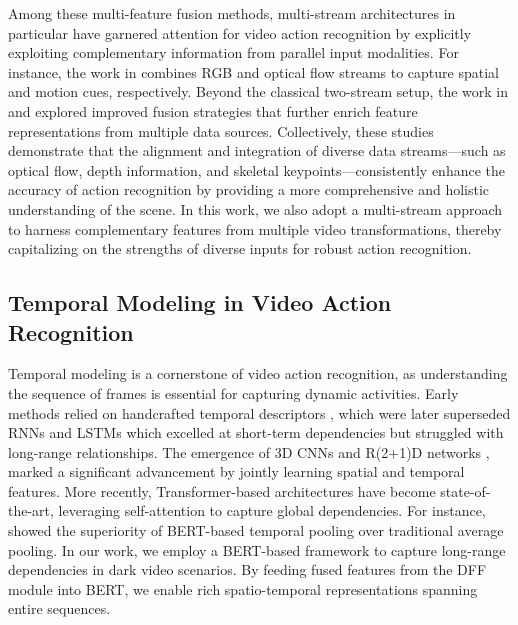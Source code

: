 Among these multi-feature fusion methods, multi-stream architectures in particular have garnered attention for video action recognition by explicitly exploiting complementary information from parallel input modalities. For instance, the work in \cite{simonyan2014two} combines RGB and optical flow streams to capture spatial and motion cues, respectively. Beyond the classical two-stream setup, the work in \cite{feichtenhofer2016convolutional} and \cite{carreira2017quo} explored improved fusion strategies that further enrich feature representations from multiple data sources. 
Collectively, these studies demonstrate that the alignment and integration of diverse data streams—such as optical flow, depth information, and skeletal keypoints—consistently enhance the accuracy of action recognition by providing a more comprehensive and holistic understanding of the scene. In this work, we also adopt a multi-stream approach to harness complementary features from multiple video transformations, thereby capitalizing on the strengths of diverse inputs for robust action recognition.

\subsection{Temporal Modeling in Video Action Recognition}

Temporal modeling is a cornerstone of video action recognition, as understanding the sequence of frames is essential for capturing dynamic activities. Early methods relied on handcrafted temporal descriptors \cite{wang2013action}\cite{laptev2008learning}, which were later superseded RNNs \cite{donahue2015long} and LSTMs \cite{srivastava2015unsupervised} which excelled at short-term dependencies but struggled with long-range relationships. The emergence of 3D CNNs \cite{tran2015learning} and R(2+1)D networks \cite{tran2018closer}, marked a significant advancement by jointly learning spatial and temporal features. More recently, Transformer-based architectures \cite{dosovitskiy2020image}\cite{vaswani2017attention} have become state-of-the-art, leveraging self-attention to capture global dependencies. For instance, \cite{kalfaoglu2020late} showed the superiority of BERT-based temporal pooling over traditional average pooling. In our work, we employ a BERT-based framework to capture long-range dependencies in dark video scenarios. By feeding fused features from the DFF module into BERT, we enable rich spatio-temporal representations spanning entire sequences.

